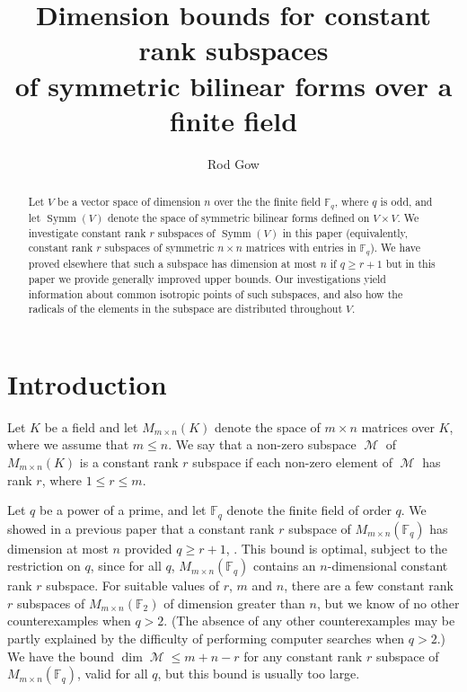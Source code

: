 \documentclass{amsart}
\DeclareMathOperator{\M}{\mathcal{M}}
\DeclareMathOperator{\Symm}{Symm}
\def\matrices{M_{m\times n}(K)}
\theoremstyle{plain}
\theoremstyle{definition}
\begin{document}
\title[Constant rank subspaces of symmetric forms]
{Dimension bounds for constant rank subspaces\\ 
of symmetric bilinear forms over a finite field} 


\author[R. Gow]{Rod Gow}
\address{School of Mathematical Sciences\\
University College Dublin\\
 Ireland}




\begin{abstract} 

Let $V$ be a vector space of dimension $n$ over the the finite field $\mathbb{F}_q$, where $q$ is odd, and 
let $\Symm(V)$ denote the space of symmetric bilinear forms defined on $V\times V$. 
We investigate constant rank $r$ subspaces of $\Symm(V)$ in this paper (equivalently, constant
rank $r$ subspaces of symmetric $n\times n$ matrices with entries in $\mathbb{F}_q$).
We have proved elsewhere that such a subspace has dimension at most $n$ if $q\geq r+1$ but in this paper we provide generally improved upper bounds.
Our investigations yield information about
common isotropic points of such subspaces, and also how the radicals of the elements in the subspace are distributed throughout $V$.



\end{abstract}
\maketitle
\section{Introduction}
\noindent  Let $K$ be a field and let $\matrices$  denote the space of $m\times n$ matrices over $K$, where we assume that $m\leq n$. We say that  a non-zero subspace $\M$ of $\matrices$ is a constant rank $r$ subspace if each non-zero element of
$\M$ has rank  $r$, where $1\leq r\leq m$.  

Let $q$ be a power of a prime, and let $\mathbb{F}_q$ denote the finite field of order $q$. We showed in a previous paper that a constant
rank $r$ subspace of $M_{m\times n}(\mathbb{F}_q)$ has dimension at most $n$ provided $q\geq r+1$, \cite{Gow}. This bound is optimal, subject
to the restriction on $q$, since for all $q$, $M_{m\times n}(\mathbb{F}_q)$ contains an $n$-dimensional constant rank $r$ subspace. 
For suitable values of $r$, $m$ and $n$, there are a few
constant rank $r$ subspaces of $M_{m\times n}(\mathbb{F}_2)$ of dimension greater than $n$, but we know of no other counterexamples when $q>2$.
(The absence of any other counterexamples may be partly explained by the difficulty of performing computer searches when $q>2$.)
We have the bound $\dim \M\leq m+n-r$ for any constant rank $r$ subspace of $M_{m\times n}(\mathbb{F}_q)$, valid for all $q$, but this bound is usually too large.
\end{document}
